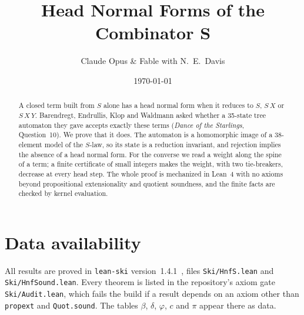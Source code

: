 \documentclass[11pt]{amsart}
\title{Head Normal Forms of the Combinator $\bm{S}$}
\author{Claude Opus \& Fable with N.\ E.\ Davis}
\date{\today}
\theoremstyle{definition}
\theoremstyle{remark}
\begin{document}
\begin{abstract}
A closed term built from $S$ alone has a head normal form when it reduces to $S$,
$S\,X$ or $S\,X\,Y$. Barendregt, Endrullis, Klop and Waldmann asked whether a 35-state
tree automaton they gave accepts exactly these terms (\emph{Dance of the Starlings},
Question~10). We prove that it does. The automaton is a homomorphic image of a 38-element
model of the $S$-law, so its state is a reduction invariant, and rejection implies the
absence of a head normal form. For the converse we read a weight along the spine of a
term; a finite certificate of small integers makes the weight, with two tie-breakers,
decrease at every head step. The whole proof is mechanized in Lean~4 with no axioms beyond
propositional extensionality and quotient soundness, and the finite facts are checked by
kernel evaluation.
\end{abstract}

\maketitle






\section*{Data availability}
All results are proved in \texttt{lean-ski} version~1.4.1~\citep{leanski}, files
\texttt{Ski/HnfS.lean} and \texttt{Ski/HnfSound.lean}. Every theorem is listed in the
repository's axiom gate \texttt{Ski/Audit.lean}, which fails the build if a result
depends on an axiom other than \texttt{propext} and \texttt{Quot.sound}. The tables
$\beta$, $\delta$, $\varphi$, $c$ and $\pi$ appear there as data.



\end{document}
